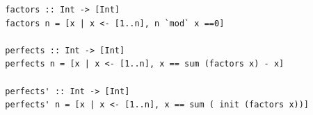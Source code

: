 \documentclass{article}
\begin{document}
\begin{Answer}
\begin{lstlisting}
  factors :: Int -> [Int]
  factors n = [x | x <- [1..n], n `mod` x ==0]
  
  perfects :: Int -> [Int]
  perfects n = [x | x <- [1..n], x == sum (factors x) - x]
  
  perfects' :: Int -> [Int]
  perfects' n = [x | x <- [1..n], x == sum ( init (factors x))]
\end{lstlisting}
\end{Answer}
\end{document}
